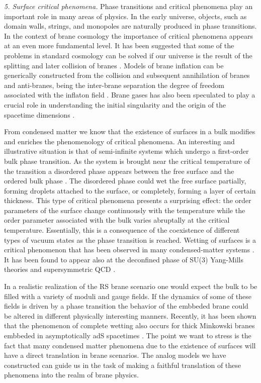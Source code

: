 \documentclass[a4paper,prl,showpacs,twocolumn]{revtex4}
\begin{document}
 
\noindent
{\it 5. Surface critical phenomena.} 
Phase transitions and critical phenomena play 
an important role in many areas of physics.
In the early universe, objects, such as domain walls, strings, and
monopoles are naturally produced in phase transitions.
In the context of brane cosmology the importance of 
critical phenomena appears at an even more fundamental level.
It has been suggested that some of the problems in standard
cosmology can be solved if our universe is the result of the splitting
and later collision of branes \cite{turok}.
Models of brane inflation can be generically constructed from the
collision and subsequent annihilation of branes and anti-branes, being
the inter-brane separation the degree of freedom associated with the
inflaton field \cite{DvaTye:1998}.
Brane gases has also been speculated to play a crucial role in
understanding the initial singularity and the origin of the spacetime
dimensions \cite{AleBraEas:2000}.

From condensed matter we know that the existence of surfaces in 
a bulk modifies and enriches the phenomenology of critical 
phenomena.
An interesting and illustrative situation is that of semi-infinite 
systems which
undergo a first-order bulk phase transition.
As the system is brought near the critical temperature of the
transition a disordered phase appears between the free surface
and the ordered bulk phase \cite{Lip:1982}.
The disordered phase could wet the free surface
partially, forming droplets attached to the surface, or completely, 
forming a layer of certain thickness. 
This type of critical phenomena presents a surprising effect:
the order parameters of the surface change continuously with 
the temperature while the order parameter associated with the
bulk varies abruptally at the critical temperature.
Essentially, this is a consequence of the coexistence of different 
types of vacuum states as the phase transition is reached.
Wetting of surfaces is a critical phenomenon that has been 
observed in many condensed-matter systems \cite{deG:1985}.
It has been found to appear also at the deconfined phase of SU(3) 
Yang-Mills theories \cite{wet_QCD} and supersymmetric QCD 
\cite{wet_SQCD}.

In a realistic realization of the RS brane 
scenario one would expect the bulk to be filled with a variety
of moduli and gauge fields. 
If the dynamics of some of these fields is driven by a phase 
transition the behavior of the embbeded brane could be altered
in different physically interesting manners.
Recently, it has been shown that the phenomenon of complete wetting 
also occurs for thick Minkowski branes embbeded in asymptotically adS 
spacetimes \cite{Cam:2002}.
The point we want to stress is the fact
that many condensed matter phenomena due to the existence
of surfaces will have a direct translation in brane scenarios.
The analog models we have constructed can guide us in the task 
of making a faithful translation of these phenomena into the 
realm of brane physics.
\end{document}
